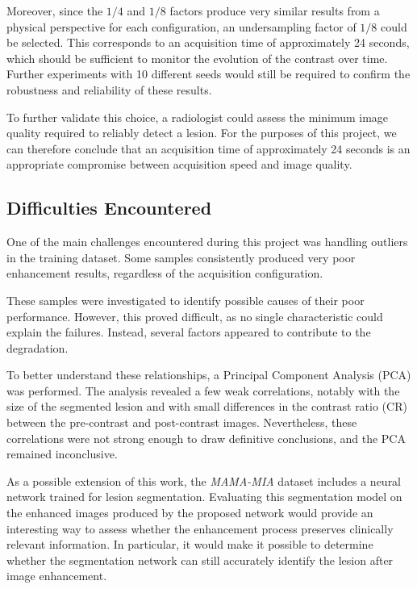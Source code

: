 \documentclass[12pt]{article}
\begin{document}
Moreover, since the $1/4$ and $1/8$ factors produce very similar results from a physical perspective for each configuration, an undersampling factor of $1/8$ could be selected. 
This corresponds to an acquisition time of approximately 24 seconds, which should be sufficient to monitor the evolution of the contrast over time.
Further experiments with 10 different seeds would still be required to confirm the robustness and reliability of these results.
\vspace{0.5cm}

To further validate this choice, a radiologist could assess the minimum image quality required to reliably detect a lesion.
For the purposes of this project, we can therefore conclude that an acquisition time of approximately 24 seconds is an appropriate compromise between acquisition speed and image quality.

\subsection{Difficulties Encountered}
One of the main challenges encountered during this project was handling outliers in the training dataset.
Some samples consistently produced very poor enhancement results, regardless of the acquisition configuration.
\vspace{0.5cm}

These samples were investigated to identify possible causes of their poor performance.
However, this proved difficult, as no single characteristic could explain the failures.
Instead, several factors appeared to contribute to the degradation.
\vspace{0.5cm}

To better understand these relationships, a Principal Component Analysis (PCA) was performed.
The analysis revealed a few weak correlations, notably with the size of the segmented lesion and with small differences in the contrast ratio (CR) between the pre-contrast and post-contrast images.
Nevertheless, these correlations were not strong enough to draw definitive conclusions, and the PCA remained inconclusive.
\vspace{0.5cm}

As a possible extension of this work, the \textit{MAMA-MIA} dataset includes a neural network trained for lesion segmentation.
Evaluating this segmentation model on the enhanced images produced by the proposed network would provide an interesting way to assess whether the enhancement process preserves clinically relevant information.
In particular, it would make it possible to determine whether the segmentation network can still accurately identify the lesion after image enhancement.
\vspace{0.5cm}
\end{document}

